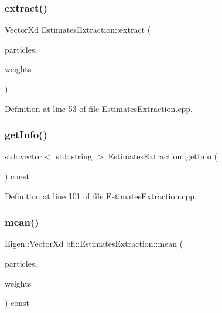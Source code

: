 \mbox{\label{classbfl_1_1EstimatesExtraction_aeb792e7d2e162c13f66903551ff82dfa}} 
\subsubsection{\texorpdfstring{extract()}{extract()}}
{\footnotesize\ttfamily Vector\+Xd Estimates\+Extraction\+::extract (\begin{DoxyParamCaption}\item[{const Eigen\+::\+Ref$<$ const Eigen\+::\+Matrix\+Xd $>$ \&}]{particles,  }\item[{const Eigen\+::\+Ref$<$ const Eigen\+::\+Vector\+Xd $>$ \&}]{weights }\end{DoxyParamCaption})}



Definition at line 53 of file Estimates\+Extraction.\+cpp.

\mbox{\label{classbfl_1_1EstimatesExtraction_a522ca7407979007a4199291a756486d6}} 
\subsubsection{\texorpdfstring{get\+Info()}{getInfo()}}
{\footnotesize\ttfamily std\+::vector$<$ std\+::string $>$ Estimates\+Extraction\+::get\+Info (\begin{DoxyParamCaption}{ }\end{DoxyParamCaption}) const}



Definition at line 101 of file Estimates\+Extraction.\+cpp.

\mbox{\label{classbfl_1_1EstimatesExtraction_ace45246c5dcc502d5c79a8db2b2f388f}} 
\subsubsection{\texorpdfstring{mean()}{mean()}}
{\footnotesize\ttfamily Eigen\+::\+Vector\+Xd bfl\+::\+Estimates\+Extraction\+::mean (\begin{DoxyParamCaption}\item[{const Eigen\+::\+Ref$<$ const Eigen\+::\+Matrix\+Xd $>$ \&}]{particles,  }\item[{const Eigen\+::\+Ref$<$ const Eigen\+::\+Vector\+Xd $>$ \&}]{weights }\end{DoxyParamCaption}) const\hspace{0.3cm}{\ttfamily [protected]}}

